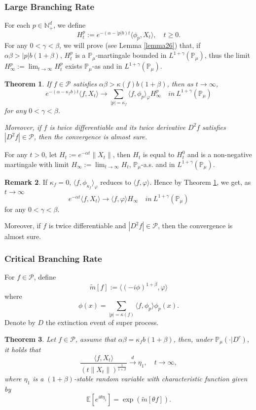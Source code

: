 \documentclass[12pt,oneside,english]{amsart}
\theoremstyle{plain}
\newtheorem{thm}{Theorem}[section]
\theoremstyle{definition}
\newtheorem{rem}[thm]{Remark}
\numberwithin{equation}{section}
\begin{document}
\subsubsection{Large Branching Rate}

For each $p\in \mathbb{N}_+^d$, we define
$$H_t^p:= e^{-(\alpha-|p|b)t}\langle\phi_p,X_t\rangle,\quad t\geq 0.$$
  For any $0<\gamma<\beta$, we will prove (see Lemma \ref{lemma26}) that, if $\alpha\beta>|p|b(1+\beta)$, $H_t^p$ is a $\mathbb{P}_{\mu}$-martingale bounded in $L^{1+\gamma}(\mathbb{P}_{\mu})$, thus the limit $H^p_{\infty}:=\lim_{t\rightarrow \infty}H_t^p$ exists $\mathbb{P}_{\mu}$-as and in $L^{1+\gamma}(\mathbb{P}_{\mu})$.
 \begin{thm}\label{Theorem11}
     If $f \in \mathcal{P}$ satisfies $\alpha\beta>\kappa(f)b(1+\beta)$, then as $t\rightarrow \infty$,
     $$e^{-(\alpha-\kappa_fb)t}\langle f, X_t\rangle \rightarrow\sum_{|p|=\kappa_f}\langle f, \phi_p\rangle_{\varphi} H_{\infty}^p \quad in~ L^{1+\gamma}(\mathbb{P}_{\mu})$$
     for any $0<\gamma<\beta$.

     Moreover, if $f$ is twice differentiable and its twice derivative $D^2 f$ satisfies $|D^2 f| \in \mathcal{P}$, then the convergence is almost sure.
 \end{thm}
For any $t>0$, let $H_t:=e^{-\alpha t}\|X_t\|$, then $H_t$ is equal to $H_t^0$ and is a non-negative martingale with limit $H_{\infty}:=\lim_{t\rightarrow\infty}H_t$,  $\mathbb{P}_{\mu}$-a.s. and in $L^{1+\gamma}(\mathbb{P}_{\mu})$.
 \begin{rem}
    If $\kappa_f=0$, $\langle f, \phi_{\kappa_f}\rangle_{\varphi}$ reduces to $\langle f,\varphi\rangle$. Hence by Theorem \ref{Theorem11}, we get, as $t\rightarrow \infty$
     $$e^{-\alpha t}\langle f, X_t\rangle \rightarrow \langle f, \varphi\rangle H_{\infty} \quad in~ L^{1+\gamma}(\mathbb{P}_{\mu})$$
    for any $0<\gamma<\beta$.

    Moreover, if $f$ is twice differentiable and $|D^2 f| \in \mathcal{P}$, then the convergence is almost sure.
 \end{rem}

\subsubsection{Critical Branching Rate}
For $f\in \mathcal{P}$, define
$$\tilde{m}[f]:= \langle(-i\phi)^{1+\beta},\varphi\rangle$$
where
$$\phi(x)=\sum_{|p|=\kappa(f)}\langle f,\phi_p\rangle\phi_p(x).$$
Denote by $D$ the extinction event of super process.
\begin{thm}\label{Theorem12}
Let $f\in\mathcal{P}$, assume that  $\alpha\beta=\kappa_fb(1+\beta)$, then, under $\mathbb{P}_{\mu}(\cdot|D^c)$, it holds that
$$\frac{\langle f,X_t\rangle}{\left(t\|X_t\|\right)^{\frac{1}{1+\beta}}}\xrightarrow{d} \eta_1, \quad t\rightarrow \infty,$$
where $\eta_1$ is a $(1+\beta)$-stable random variable with characteristic function given by
$$\mathbb{E} [e^{i\theta \eta_1}]=\exp(\tilde{m}[\theta f]).$$
\end{thm}
\end{document}
